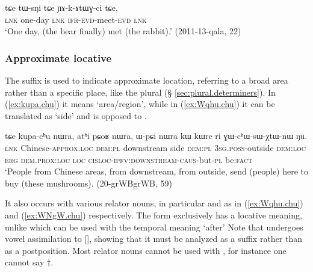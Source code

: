  \begin{exe}
\ex \label{ex:tWsNi.tCe}
\gll   tɕe tɯ-sŋi tɕe ɲɤ-k-ɤtɯɣ-ci tɕe, \\
\textsc{lnk} one-day \textsc{lnk} \textsc{ifr}-\textsc{evd}-meet-\textsc{evd} \textsc{lnk} \\
\glt  `One day, (the bear finally) met (the rabbit).' (2011-13-qala, 22)
\end{exe}


\subsubsection{Approximate locative} \label{sec:approximate.locative}
The suffix  is used to indicate approximate location, referring to a broad area rather than a specific place, like the plural  (§ \ref{sec:plural.determiners}). In (\ref{ex:kupa.chu}) it means `area/region', while in (\ref{ex:Wqhu.chu}) it can be translated as `side' and is opposed to .
 
 \begin{exe}
\ex \label{ex:kupa.chu}
 \gll  tɕe kupa-cʰu nɯra, atʰi pɕoʁ nɯra, ɯ-pɕi nɯra kɯ kɯre ri ɣɯ-cʰɯ-sɯ-χtɯ-nɯ ŋu.  \\
 \textsc{lnk} Chinese-\textsc{approx}.\textsc{loc} \textsc{dem}:\textsc{pl}  downstream side \textsc{dem}:\textsc{pl} \textsc{3sg}.\textsc{poss}-outside \textsc{dem}:\textsc{loc} \textsc{erg} \textsc{dem}.\textsc{prox}:\textsc{loc} \textsc{loc} \textsc{cisloc}-\textsc{ipfv}:\textsc{downstream}-\textsc{caus}-but-\textsc{pl} be:\textsc{fact} \\
 \glt `People from Chinese areas, from downstream, from outside, send (people) here to buy (these mushrooms). (20-grWBgrWB, 59)
 \end{exe}
 
 It also occurs with various relator nouns, in particular  and  as in (\ref{ex:Wqhu.chu}) and (\ref{ex:WNgW.chu}) respectively. The form exclusively has a locative meaning, unlike  which can be used with the temporal meaning `after' Note that  undergoes vowel assimilation to [], showing that it must be analyzed as a suffix rather than as a postposition. Most relator nouns cannot be used with , for instance one cannot say $\dagger$.

